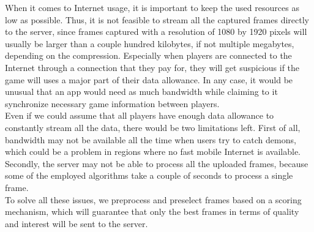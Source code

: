 When it comes to Internet usage, it is important to keep the used resources as low as possible. 
Thus, it is not feasible to stream all the captured frames directly to the server, since frames captured with a resolution of 1080 by 1920 pixels will usually be larger than a couple hundred kilobytes, if not multiple megabytes, depending on the compression.
Especially when players are connected to the Internet through a connection that they pay for, they will get suspicious if the game will uses a major part of their data allowance.
In any case, it would be unusual that an app would need as much bandwidth while claiming to it synchronize necessary game information between players.\\
Even if we could assume that all players have enough data allowance to constantly stream all the data, there would be two limitations left.
First of all, bandwidth may not be available all the time when users try to catch demons, which could be a problem in regions where no fast mobile Internet is available.
Secondly, the server may not be able to process all the uploaded frames, because some of the employed algorithms take a couple of seconds to process a single frame.\\
To solve all these issues, we preprocess and preselect frames based on a scoring mechanism, which will guarantee that only the best frames in terms of quality and interest will be sent to the server.

